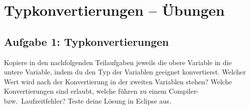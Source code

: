 \clearpage

\rehead[]{\textcolor{lightblue}{AvHG, Inf, My}}
\lohead[]{\textcolor{lightblue}{AvHG, Inf, My}}

\section{Typkonvertierungen -- Übungen \tagZusatz \tagLK}

\subsection{Aufgabe 1: Typkonvertierungen}

Kopiere in den nachfolgenden Teilaufgaben jeweils die obere Variable in die
untere Variable, indem du den Typ der Variablen geeignet konvertierst. Welcher
Wert wird nach der Konvertierung in der zweiten Variablen stehen? Welche
Konvertierungen sind erlaubt, welche führen zu einem Compiler- bzw.\
Laufzeitfehler? Teste deine Lösung in Eclipse aus.

